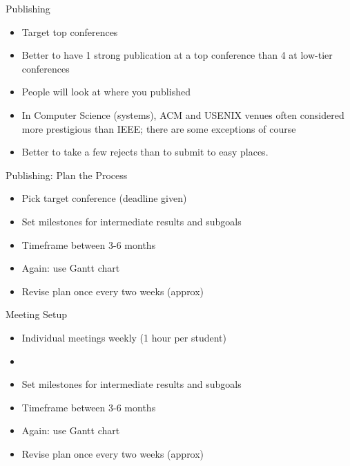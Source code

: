 \documentclass[hyperref={pdfpagelabels=false}, aspectratio=1610]{beamer}
\begin{document}
\begin{frame}
\begin{block}{Publishing}
 \begin{itemize}
  \item Target top conferences
  \item Better to have 1 strong publication at a top conference 
        than 4 at low-tier conferences
  \item People will look at where you published
  \item In Computer Science (systems), ACM and USENIX venues often considered more prestigious than IEEE; there are some exceptions of course
  \item Better to take a few rejects than to submit to easy places.
 \end{itemize}
\end{block}
\end{frame}

\begin{frame}
\begin{block}{Publishing: Plan the Process}
 \begin{itemize}
  \item Pick target conference (deadline given)
  \item Set milestones for intermediate results and subgoals
  \item Timeframe between 3-6 months
  \item Again: use Gantt chart
  \item Revise plan once every two weeks (approx)
 \end{itemize}
\end{block}
\end{frame}

\begin{frame}
\begin{block}{Meeting Setup}
 \begin{itemize}
  \item Individual meetings weekly (1 hour per student)
  \item 
  \item Set milestones for intermediate results and subgoals
  \item Timeframe between 3-6 months
  \item Again: use Gantt chart
  \item Revise plan once every two weeks (approx)
 \end{itemize}
\end{block}
\end{frame}
\end{document}
